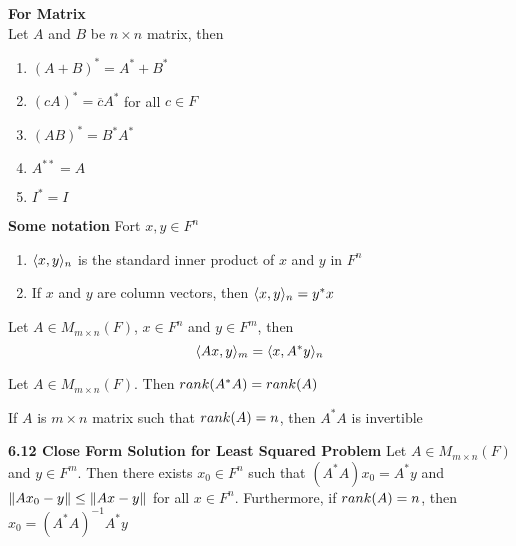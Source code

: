 \documentclass[11pt]{article}
\begin{document}
\begin{corollary*}
    \textbf{For Matrix} \\
    Let $A$ and $B$ be $n\times n$ matrix, then 
    \begin{enumerate}
        \item $(A+B)^* = A^* + B^*$ 
        \item $(cA)^* = \overline{c}A^*$ for all $c\in F$
        \item $(AB)^* = B^*A^*$ 
        \item $A^{**} = A$ 
        \item $I^* = I$ 
    \end{enumerate}
\end{corollary*}


\begin{defn*}
    \textbf{Some notation} Fort $x,y\in F^n$ 
    \begin{enumerate}
        \item $\langle x,y\rangle_n$ is the standard inner product of $x$ and $y$  in $F^n$
        \item If $x$ and $y$ are column vectors, then $\langle x,y\rangle_n = y^*x$ 
    \end{enumerate}
\end{defn*}


\begin{lemma*}
    Let $A\in M_{m\times n}(F)$, $x\in F^n$ and $y\in F^m$, then 
    \[
        \langle Ax,y\rangle_m = \langle x,A^*y\rangle_n    
    \]
\end{lemma*}

\begin{lemma*}
    Let $A\in M_{m\times n}(F)$. Then $rank(A^*A)=rank(A)$
\end{lemma*}

\begin{corollary*}
    If $A$ is $m\times n$ matrix such that $rank(A)=n$, then $A^*A$ is invertible
\end{corollary*}


\begin{theorem*}
    \textbf{6.12 Close Form Solution for Least Squared Problem} Let $A\in M_{m\times n}(F)$ and $y\in F^m$. Then there exists $x_0\in F^n$ such that $(A^*A)x_0 = A^*y$ and $\left\lVert Ax_0 - y\right\rVert \leq \left\lVert Ax -y\right\rVert$ for all $x\in F^n$. Furthermore, if $rank(A)=n$, then $x_0 = (A^*A)^{-1}A^*y$ 
\end{theorem*}


\end{document}
